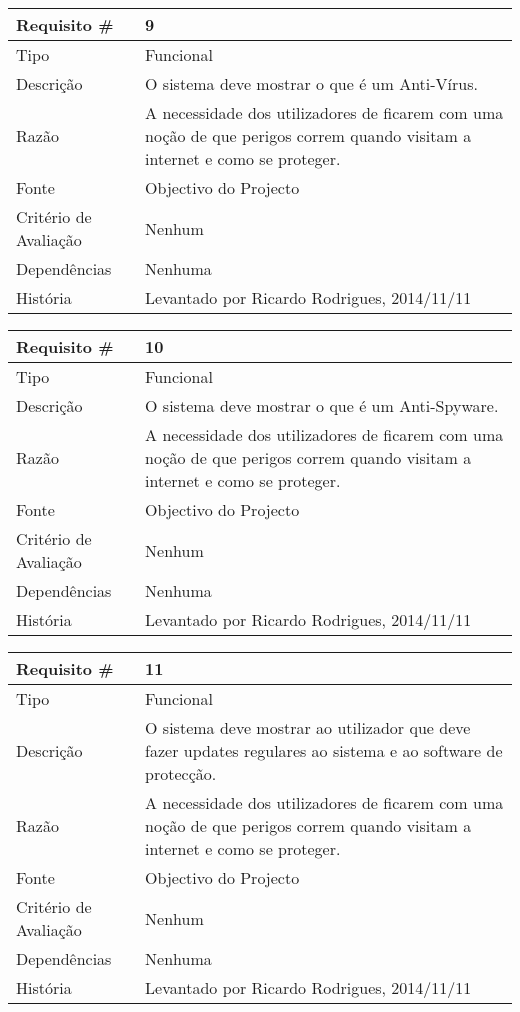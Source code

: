 \begin{tabular} {|l|p{8cm}|} 
\hline
Requisito \# & 9 \\
\hline
Tipo & Funcional \\
\hline
Descrição & O sistema deve mostrar o que é um Anti-Vírus. \\
\hline
Razão & A necessidade dos utilizadores de ficarem com uma noção de que perigos correm quando visitam a internet e como se proteger. \\
\hline
Fonte & Objectivo do Projecto \\
\hline
Critério de Avaliação & Nenhum\\
\hline
Dependências & Nenhuma \\
\hline
História & Levantado por Ricardo Rodrigues, 2014/11/11 \\
\hline
\end{tabular}

\begin{tabular} {|l|p{8cm}|} 
\hline
Requisito \# & 10 \\
\hline
Tipo & Funcional \\
\hline
Descrição & O sistema deve mostrar o que é um Anti-Spyware. \\
\hline
Razão & A necessidade dos utilizadores de ficarem com uma noção de que perigos correm quando visitam a internet e como se proteger. \\
\hline
Fonte & Objectivo do Projecto \\
\hline
Critério de Avaliação & Nenhum\\
\hline
Dependências & Nenhuma \\
\hline
História & Levantado por Ricardo Rodrigues, 2014/11/11 \\
\hline
\end{tabular}

\begin{tabular} {|l|p{8cm}|} 
\hline
Requisito \# & 11 \\
\hline
Tipo & Funcional \\
\hline
Descrição & O sistema deve mostrar ao utilizador que deve fazer updates regulares ao sistema e ao software de protecção. \\
\hline
Razão & A necessidade dos utilizadores de ficarem com uma noção de que perigos correm quando visitam a internet e como se proteger. \\
\hline
Fonte & Objectivo do Projecto \\
\hline
Critério de Avaliação & Nenhum\\
\hline
Dependências & Nenhuma \\
\hline
História & Levantado por Ricardo Rodrigues, 2014/11/11 \\
\hline
\end{tabular}

